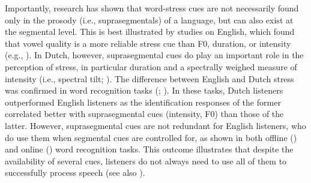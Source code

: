 Importantly, research has shown that word-stress cues are not necessarily found only in the prosody (i.e., suprasegmentals) of a language, but can also exist at the segmental level. This is best illustrated by studies on English, which found that vowel quality is a more reliable stress cue than F0, duration, or intensity (e.g., \citealt{fear_strong_1995}). In Dutch, however, suprasegmental cues do play an important role in the perception of stress, in particular duration and a spectrally weighed measure of intensity (i.e., spectral tilt; \citealt{sluijter_spectral_1996}). The difference between English and Dutch stress was confirmed in word recognition tasks (\citealt{cooper_constraints_2002}; \citealt{cutler_dutch_2007}). In these tasks, Dutch listeners outperformed English listeners as the identification responses of the former correlated better with suprasegmental cues (intensity, F0) than those of the latter. However, suprasegmental cues are not redundant for English listeners, who do use them when segmental cues are controlled for, as shown in both offline (\citealt{cooper_constraints_2002}) and online (\citealt{jesse_english_2017}) word recognition tasks. This outcome illustrates that despite the availability of several cues, listeners do not always need to use all of them to successfully process speech (see also \citealt{connell_english_2018}).

